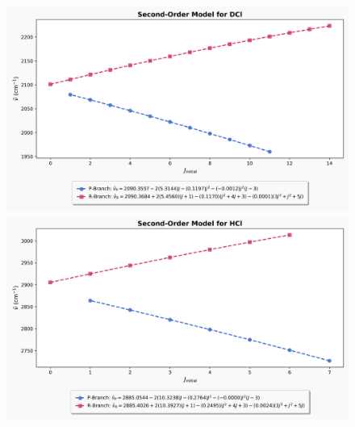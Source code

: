 \documentclass[titlepage]{article}
\begin{document}
\begin{figure}[htbp]
    \begin{minipage}[t]{\textwidth}
        \centering
        \includegraphics[width=\linewidth]{example-analysis/dcl-second-order-fit.png}
    \end{minipage}
\caption*{\mbox{}}
\begin{minipage}[t]{\textwidth}
        \centering
        \includegraphics[width=\linewidth]{example-analysis/hcl-second-order-fit.png}
    \end{minipage}
\end{figure}
\end{document}
